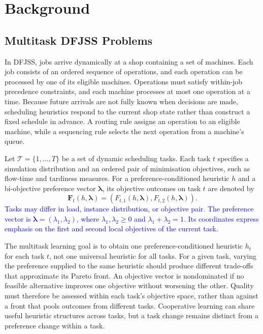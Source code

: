 \documentclass[10pt,journal]{IEEEtran}
\newcommand{\revision}[1]{\textcolor{blue}{#1}}
\begin{document}
\section{Background}
\label{sec:background}
\subsection{Multitask DFJSS Problems}
In DFJSS, jobs arrive dynamically at a shop containing a set of machines. Each job consists of an ordered sequence of operations, and each operation can be processed by one of its eligible machines. Operations must satisfy within-job precedence constraints, and each machine processes at most one operation at a time. Because future arrivals are not fully known when decisions are made, scheduling heuristics respond to the current shop state rather than construct a fixed schedule in advance. A routing rule assigns an operation to an eligible machine, while a sequencing rule selects the next operation from a machine's queue.

Let $\mathcal{T}=\{1,\ldots,T\}$ be a set of dynamic scheduling tasks. Each task $t$ specifies a simulation distribution and an ordered pair of minimisation objectives, such as flow-time and tardiness measures. For a preference-conditioned heuristic $h$ and a bi-objective preference vector $\boldsymbol{\lambda}$, its objective outcomes on task $t$ are denoted by
\begin{equation}
    \mathbf{F}_t(h,\boldsymbol{\lambda})=
    \left(F_{t,1}(h,\boldsymbol{\lambda}),F_{t,2}(h,\boldsymbol{\lambda})\right).
\end{equation}
\revision{Tasks may differ in load, instance distribution, or objective pair. The preference vector is $\boldsymbol{\lambda}=(\lambda_1,\lambda_2)$, where $\lambda_1,\lambda_2\geq 0$ and $\lambda_1+\lambda_2=1$. Its coordinates express emphasis on the first and second local objectives of the current task.}

The multitask learning goal is to obtain one preference-conditioned heuristic $h_t$ for each task $t$, not one universal heuristic for all tasks. For a given task, varying the preference supplied to the same heuristic should produce different trade-offs that approximate its Pareto front. An objective vector is nondominated if no feasible alternative improves one objective without worsening the other. Quality must therefore be assessed within each task's objective space, rather than against a front that pools outcomes from different tasks. Cooperative learning can share useful heuristic structures across tasks, but a task change remains distinct from a preference change within a task.
\end{document}
